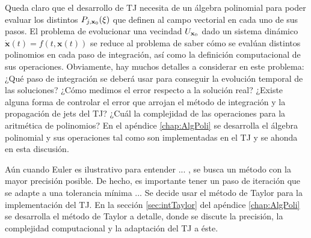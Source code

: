 Queda claro que el desarrollo de TJ necesita de un álgebra polinomial para poder evaluar los distintos $P_{j,\mathbf{x}_0}(\xi)$ que definen al campo vectorial en cada uno de sus pasos. El problema de evolucionar una vecindad $U_{\mathbf{x}_0}$ dado un sistema dinámico $\dot{\mathbf{x}}(t) = f(t,\mathbf{x}(t))$ se reduce al problema de saber cómo se evalúan distintos polinomios en cada paso de integración, así como la definición computacional de sus operaciones. Obviamente, hay muchos detalles a considerar en este problema: ¿Qué paso de integración se deberá usar para conseguir la evolución temporal de las soluciones? ¿Cómo medimos el error respecto a la solución real? ¿Existe alguna forma de controlar el error que arrojan el método de integración y la propagación de jets del TJ? ¿Cuál la complejidad de las operaciones para la aritmética de polinomios? En el apéndice \ref{chap:AlgPoli} se desarrolla el álgebra polinomial y sus operaciones tal como son implementadas en el TJ y se ahonda en esta discusión. 



Aún cuando Euler es ilustrativo para entender ... , se busca un método con la mayor precisión posible. De hecho, es importante tener un paso de iteración que se adapte a una tolerancia mínima ... Se decide usar el método de Taylor para la implementación del TJ. En la sección \ref{sec:intTaylor} del apéndice \ref{chap:AlgPoli} se desarrolla el método de Taylor a detalle, donde se discute la precisión, la complejidad computacional y la adaptación del TJ a éste.



 